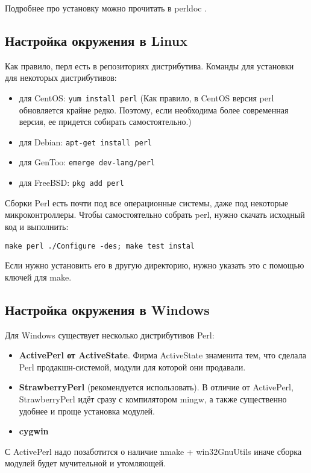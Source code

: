 Подробнее про установку можно прочитать в perldoc .

\subsection{Настройка окружения в Linux}
Как правило, перл есть в репозиториях дистрибутива. Команды для установки для некоторых дистрибутивов:
\begin{itemize}
 \item для CentOS: \verb|yum install perl| (Как правило, в CentOS версия perl обновляется крайне редко. Поэтому, если необходима более современная версия, ее придется собирать самостоятельно.)
 \item для Debian: \verb|apt-get install perl|
 \item для GenToo: \verb|emerge dev-lang/perl|
 \item для FreeBSD: \verb|pkg add perl|
\end{itemize}
Сборки Perl есть почти под все операционные системы, даже под некоторые микроконтроллеры. Чтобы самостоятельно собрать perl, нужно скачать исходный код и выполнить:
\begin{verbatim}
make perl ./Configure -des; make test instal
\end{verbatim}
Если нужно установить его в другую директорию, нужно указать это с помощью ключей для make.

\subsection{Настройка окружения в Windows}
Для Windows существует несколько дистрибутивов Perl:
\begin{itemize}
  \item \textbf{ActivePerl от ActiveState}. Фирма ActiveState знаменита тем, что сделала Perl продакшн-системой, модули для которой они продавали.
  \item \textbf{StrawberryPerl} (рекомендуется использовать). В отличие от ActivePerl, StrawberryPerl идёт сразу с компилятором mingw, а также существенно удобнее и проще установка модулей.
  \item \textbf{cygwin}
\end{itemize}
С ActivePerl надо позаботится о наличие nmake + win32GnuUtils иначе сборка модулей будет мучительной и утомляющей.


